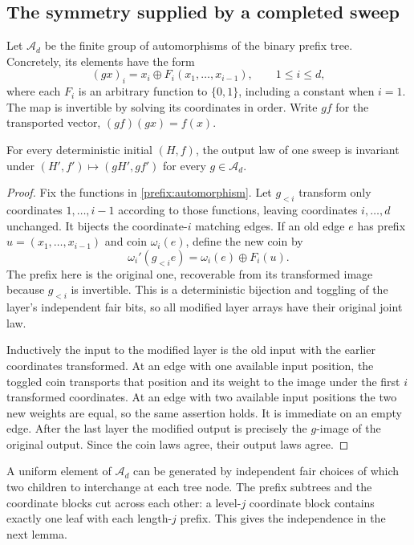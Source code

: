 \subsection{The symmetry supplied by a completed sweep}
Let $\mathcal A_d$ be the finite group of automorphisms of the binary
prefix tree.  Concretely, its elements have the form
\begin{equation}\label{prefix:automorphism}
 (gx)_i=x_i\oplus F_i(x_1,\ldots,x_{i-1}),\qquad 1\le i\le d,
\end{equation}
where each $F_i$ is an arbitrary function to $\{0,1\}$, including
a constant when $i=1$.  The map is invertible by solving its coordinates
in order.  Write $gf$ for the transported vector,
$(gf)(gx)=f(x)$.

\begin{lemma}\label{prefix:invariance}
For every deterministic initial $(H,f)$, the output law of one sweep
is invariant under $(H',f')\mapsto(gH',gf')$ for every
$g\in\mathcal A_d$.
\end{lemma}
\begin{proof}
Fix the functions in \eqref{prefix:automorphism}. Let $g_{<i}$
transform only coordinates $1,\ldots,i-1$ according to those functions,
leaving coordinates $i,\ldots,d$ unchanged. It bijects the
coordinate-$i$ matching edges. If an old edge $e$ has prefix
$u=(x_1,\ldots,x_{i-1})$ and coin $\omega_i(e)$, define the new
coin by
\[
 \omega_i'(g_{<i}e)=\omega_i(e)\oplus F_i(u).
\]
The prefix here is the original one, recoverable from its transformed
image because $g_{<i}$ is invertible. This is a deterministic
bijection and toggling of the layer's independent fair bits, so all
modified layer arrays have their original joint law.

Inductively the input to the modified layer is the old input with
the earlier coordinates transformed. At an edge with one available input
position, the toggled coin
transports that position and its weight to the image under the first
$i$ transformed coordinates. At an edge with two available input
positions the two new weights are equal, so the same assertion holds.  It is immediate on an empty
edge.  After the last layer the modified output is precisely the
$g$-image of the original output.  Since the coin laws agree, their
output laws agree.
\end{proof}

A uniform element of $\mathcal A_d$ can be generated by independent
fair choices of which two children to interchange at each tree node.
The prefix subtrees and the coordinate blocks cut across each other:
a level-$j$ coordinate block contains exactly one leaf with each
length-$j$ prefix.  This gives the independence in the next lemma.

